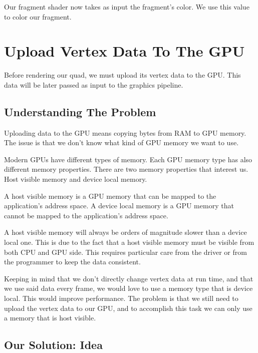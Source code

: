 Our fragment shader now takes as input the fragment's color.
We use this value to color our fragment.

\begin{minipage}{\linewidth}{\noindent}
    
\end{minipage}

\section{Upload Vertex Data To The GPU}

Before rendering our quad, we must upload its vertex data to the GPU.
This data will be later passed as input to the graphics pipeline.

\subsection{Understanding The Problem}

Uploading data to the GPU means copying bytes from RAM to GPU memory.
The issue is that we don't know what kind of GPU memory we want to use.

Modern GPUs have different types of memory.
Each GPU memory type has also different memory properties.
There are two memory properties that interest us.
Host visible memory and device local memory.

A host visible memory is a GPU memory that can be mapped to the
application's address space.
A device local memory is a GPU memory that cannot be mapped to the
application's address space.

A host visible memory will always be orders of magnitude slower than a
device local one.
This is due to the fact that a host visible memory must be visible from both
CPU and GPU side.
This requires particular care from the driver or from the programmer
to keep the data consistent.

Keeping in mind that we don't directly change vertex data at run time,
and that we use said data every frame, we would love to use a memory type
that is device local.
This would improve performance.
The problem is that we still need to upload the vertex data to our GPU,
and to accomplish this task we can only use a memory that is host visible.

\subsection{Our Solution: Idea}

